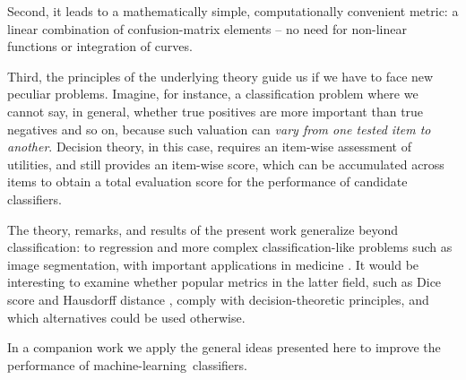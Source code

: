 \documentclass[\ifafour a4paper,12pt,\else a5paper,10pt,\fi%
onecolumn,oneside,article,%
british%
]{memoir}
\makeatletter
\newcommand*{\widefbox}[1]{\fbox{\hspace{1em}#1\hspace{1em}}}
\theoremstyle{remark}
\theoremstyle{innote}
\def\sum{\DOTSI\sumop\slimits@}
\newcommand*{\pencil}{{\fontencoding{U}\fontfamily{fontawesometwo}\selectfont\symbol{210}}}
\newcommand{\mynotep}[1]{{\footnotesize\color{notecolour}\pencil\ #1}}
\newcommand*{\de}{\partialup}%
\newcommand*{\p}{\mathrm{p}}%
\renewcommand*{\|}[1][]{\nonscript\:#1\vert\nonscript\:\mathopen{}}
\newcommand*{\tsum}{\mathop{\textstyle\sum}\nolimits}
\newcommand*{\ml}{machine-learning}
\makeatother
\begin{document}
Second, it leads to a mathematically simple, computationally convenient metric: a linear combination of confusion-matrix elements -- no need for non-linear functions or integration of curves.

Third, the principles of the underlying theory guide us if we have to face new peculiar problems. Imagine, for instance, a classification problem where we cannot say, in general, whether true positives are more important than true negatives and so on, because such valuation can \emph{vary from one tested item to another}. Decision theory, in this case, requires an item-wise assessment of utilities, and still provides an item-wise score, which can be accumulated across items to obtain a total evaluation score for the performance of candidate classifiers.

\medskip

The theory, remarks, and results of the present work generalize beyond classification: to regression and more complex classification-like problems such as image segmentation, with important applications in medicine \autocites{lundervoldetal2019}. It would be interesting to examine whether popular metrics in the latter field, such as Dice score \autocites{dice1945,fleiss1975,zijdenbosetal1994} and Hausdorff distance \autocites{altetal2000}, comply with decision-theoretic principles, and which alternatives could be used otherwise.

In a companion work \autocites{dyrlandetal2022b} we apply the general ideas presented here to improve the performance of \ml\ classifiers.









\end{document}
